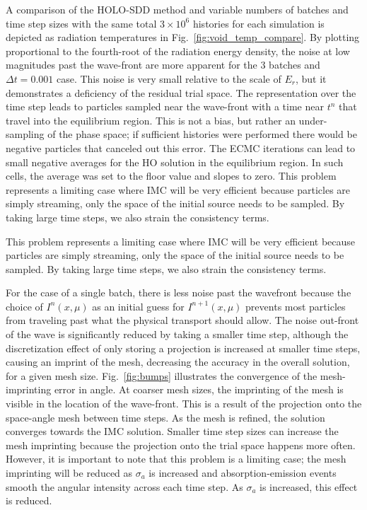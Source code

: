 \documentclass{anstrans}
\begin{document}
A comparison of the HOLO-SDD method and variable numbers of batches and time step sizes with the
same total $3\times10^6$ histories for each simulation is
depicted as radiation temperatures in Fig.~\ref{fig:void_temp_compare}.  By plotting
proportional to the fourth-root of the radiation energy density, the noise at low
magnitudes past the wave-front are more apparent for the 3 batches and $\Delta t = 0.001$
case.  This noise is very small relative to the scale of $E_r$, but it demonstrates a
deficiency of the residual trial space.  The representation over
the time step leads to particles sampled near the wave-front with a time near
$t^{n}$ that travel into the equilibrium region.  This is not a
bias, but rather an under-sampling of the phase space; if sufficient histories were performed there
would be negative particles that canceled out this error. The ECMC iterations can lead to small negative
averages for the HO solution in the equilibrium region.   In such cells, the
average was set to the floor value and slopes to zero.  
This problem represents a limiting case where IMC will be very efficient
because particles are simply streaming, only the space of the initial source needs to be sampled.
By taking large time steps, we also strain the consistency terms.

This problem represents a limiting case where IMC will be very efficient
because particles are simply streaming, only the space of the initial source needs to be sampled.
By taking large time steps, we also strain the consistency terms.


For the case of a single batch, 
there is less noise past the wavefront because the
choice of $I^{n}(x,\mu)$ as an initial guess for $I^{n+1}(x,\mu)$ prevents most particles from
traveling past what the physical transport should allow.
The noise out-front of the wave is significantly reduced by taking a smaller time step, although the
discretization effect of only
storing a projection is increased at smaller time steps, causing an imprint of the mesh, decreasing the accuracy in the overall
solution, for a given mesh size.  Fig.~\ref{fig:bumps} illustrates the convergence of the
mesh-imprinting error in angle.
At coarser mesh sizes, the imprinting of the mesh is visible in the location of
the wave-front.  This is a result of the projection onto the space-angle mesh between time
steps.  As the mesh is refined, the solution converges towards the IMC solution.  
Smaller time step sizes can increase the mesh imprinting because the projection onto the
trial space happens more often.  However, it is important to note that this problem is a
limiting case; the mesh imprinting will be reduced as $\sigma_a$ is increased and
absorption-emission events smooth the angular intensity across each time step.
As $\sigma_a$ is increased, this effect is reduced.
\end{document}
